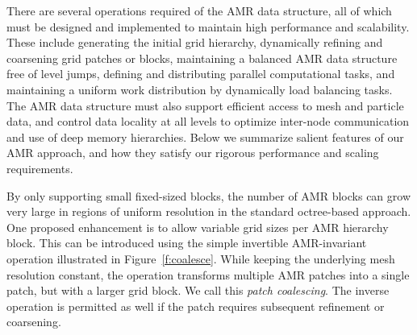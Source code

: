 \documentclass[11pt,letterpaper]{article}
\begin{document}


There are several operations required of the AMR data structure, all
of which must be designed and implemented to maintain high performance
and scalability.  These include generating the initial grid hierarchy,
dynamically refining and coarsening grid patches or blocks,
maintaining a balanced AMR data structure free of level jumps,
defining and distributing parallel computational tasks, and
maintaining a uniform work distribution by dynamically load balancing
tasks.  The AMR data structure must also support efficient access to
mesh and particle data, and control data locality at all levels to
optimize inter-node communication and use of deep memory hierarchies.
Below we summarize salient features of our AMR approach, and how they
satisfy our rigorous performance and scaling requirements.


%
By only supporting small fixed-sized blocks, the number of AMR blocks
can grow very large in regions of uniform resolution in the standard
octree-based approach.  One proposed enhancement is to allow variable
grid sizes per AMR hierarchy block.  This can be introduced using the
simple invertible AMR-invariant operation illustrated in
Figure~\ref{f:coalesce}.  While keeping the underlying mesh resolution
constant, the operation transforms multiple AMR patches into a single
patch, but with a larger grid block.  We call this \textit{patch
  coalescing}.  The inverse operation is permitted as well if the
patch requires subsequent refinement or coarsening.
\end{document}
